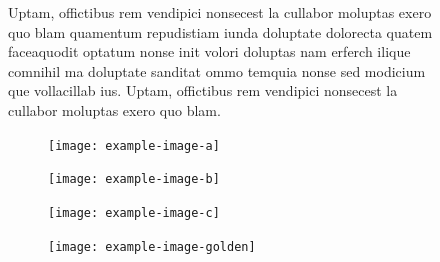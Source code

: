 \documentclass[final]{beamer}
\newlength{\sepmargin}
\newlength{\sepwid}
\newlength{\onecolwid}
\begin{document}
\begin{frame}[t]
\begin{columns}[t]
\begin{column}{\onecolwid}
    \end{column}
        
    \begin{column}{\sepwid}  \end{column}
        
    \begin{column}{\onecolwid} %
      
      \begin{block}{\vspace*{2.7cm}}
        Uptam, offictibus rem vendipici nonsecest la cullabor moluptas exero quo blam quamentum repudistiam iunda doluptate dolorecta quatem faceaquodit optatum nonse init volori doluptas nam erferch ilique comnihil ma doluptate sanditat ommo temquia nonse sed modicium que vollacillab ius. Uptam, offictibus rem vendipici nonsecest la cullabor moluptas exero quo blam.
      \end{block}
      
      \begin{block}{ }
	\begin{figure}
          \vspace*{-1cm}
          \texttt{[image: example-image-a]}
	\end{figure}
	\begin{figure}
          \texttt{[image: example-image-b]}
	\end{figure}
        
        \begin{multicols}{2}
          \begin{figure}
            \vspace*{-0.95cm}
            \texttt{[image: example-image-c]}
	  \end{figure}
          \begin{figure}
            \vspace*{-0.95cm}
            \texttt{[image: example-image-golden]}
	  \end{figure}
        \end{multicols}
        
        
      \end{block}
    \end{column}
    
    \begin{column}{\sepmargin} \end{column}
  \end{columns} 
  

\end{frame}
\end{document}
